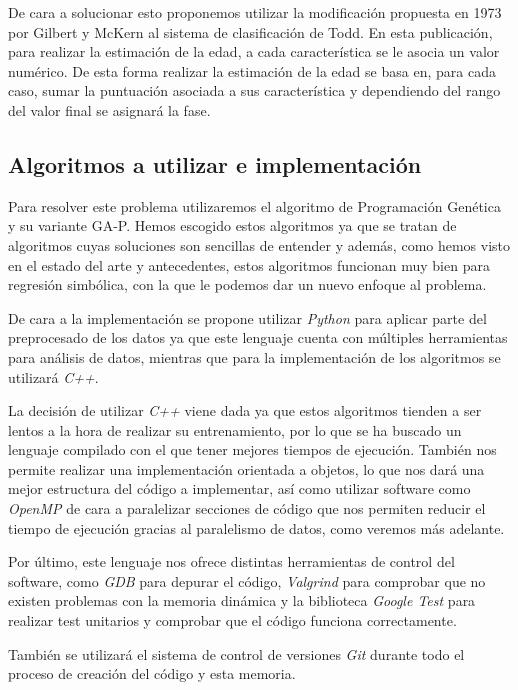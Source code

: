 De cara a solucionar esto proponemos utilizar la modificación propuesta en 1973 por Gilbert y McKern \cite{propuestaGilbert} al sistema de clasificación de Todd. En esta publicación, para realizar la estimación de la edad, a cada característica se le asocia un valor numérico. De esta forma realizar la estimación de la edad se basa en, para cada caso, sumar la puntuación asociada a sus característica y dependiendo del rango del valor final se asignará la fase.

\newpage

\subsection{Algoritmos a utilizar e implementación}

Para resolver este problema utilizaremos el algoritmo de Programación Genética y su variante GA-P. Hemos escogido estos algoritmos ya que se tratan de algoritmos cuyas soluciones son sencillas de entender y además, como hemos visto en el estado del arte y antecedentes, estos algoritmos funcionan muy bien para regresión simbólica, con la que le podemos dar un nuevo enfoque al problema.

De cara a la implementación se propone utilizar \textit{Python} para aplicar parte del preprocesado de los datos ya que este lenguaje cuenta con múltiples herramientas para análisis de datos, mientras que para la implementación de los algoritmos se utilizará \textit{C++}.

La decisión de utilizar \textit{C++} viene dada ya que estos algoritmos tienden a ser lentos a la hora de realizar su entrenamiento, por lo que se ha buscado un lenguaje compilado con el que tener mejores tiempos de ejecución. También nos permite realizar una implementación orientada a objetos, lo que nos dará una mejor estructura del código a implementar, así como utilizar software como \textit{OpenMP} \cite{OpenMP} de cara a paralelizar secciones de código que nos permiten reducir el tiempo de ejecución gracias al paralelismo de datos, como veremos más adelante.

Por último, este lenguaje nos ofrece distintas herramientas de control del software, como \textit{GDB} \cite{gdb} para depurar el código, \textit{Valgrind} \cite{valgrind} para comprobar que no existen problemas con la memoria dinámica y la biblioteca \textit{Google Test} \cite{gtest} para realizar test unitarios y comprobar que el código funciona correctamente.

También se utilizará el sistema de control de versiones \textit{Git} \cite{git} durante todo el proceso de creación del código y esta memoria.


\newpage
